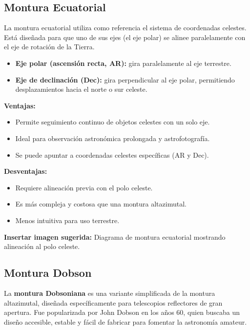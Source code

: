 \subsection{Montura Ecuatorial}
\label{subsec:montura_ecuatorial}

La montura ecuatorial utiliza como referencia el sistema de coordenadas celestes. Está diseñada para que uno de sus ejes (el eje polar) se alinee paralelamente con el eje de rotación de la Tierra.

\begin{itemize}
	\item \textbf{Eje polar (ascensión recta, AR):} gira paralelamente al eje terrestre.
	\item \textbf{Eje de declinación (Dec):} gira perpendicular al eje polar, permitiendo desplazamientos hacia el norte o sur celeste.
\end{itemize}

\textbf{Ventajas:}
\begin{itemize}
	\item Permite seguimiento continuo de objetos celestes con un solo eje.
	\item Ideal para observación astronómica prolongada y astrofotografía.
	\item Se puede apuntar a coordenadas celestes específicas (AR y Dec).
\end{itemize}

\textbf{Desventajas:}
\begin{itemize}
	\item Requiere alineación previa con el polo celeste.
	\item Es más compleja y costosa que una montura altazimutal.
	\item Menos intuitiva para uso terrestre.
\end{itemize}

\vspace{0.3cm}
\textbf{Insertar imagen sugerida:} Diagrama de montura ecuatorial mostrando alineación al polo celeste.

\subsection{Montura Dobson}
\label{subsec:montura_dobson}

La \textbf{montura Dobsoniana} es una variante simplificada de la montura altazimutal, diseñada específicamente para telescopios reflectores de gran apertura. Fue popularizada por John Dobson en los años 60, quien buscaba un diseño accesible, estable y fácil de fabricar para fomentar la astronomía amateur.

